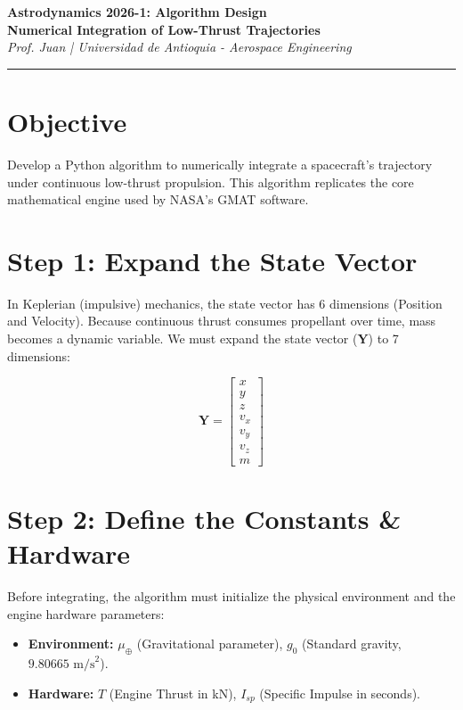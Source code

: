\documentclass[11pt, letterpaper]{article}
\begin{document}
\begin{center}
    {\Large \textbf{Astrodynamics 2026-1: Algorithm Design}} \\
    \vspace{0.2cm}
    {\huge \textbf{Numerical Integration of Low-Thrust Trajectories}} \\
    \vspace{0.4cm}
    \textit{Prof. Juan | Universidad de Antioquia - Aerospace Engineering}
\end{center}

\hrule
\vspace{0.5cm}

\section*{Objective}
Develop a Python algorithm to numerically integrate a spacecraft's trajectory under continuous low-thrust propulsion. This algorithm replicates the core mathematical engine used by NASA's GMAT software.

\section*{Step 1: Expand the State Vector}
In Keplerian (impulsive) mechanics, the state vector has 6 dimensions (Position and Velocity). Because continuous thrust consumes propellant over time, mass becomes a dynamic variable. We must expand the state vector ($\boldsymbol{Y}$) to 7 dimensions:

\begin{equation}
    \boldsymbol{Y} = 
    \begin{bmatrix}
        x \\ y \\ z \\ v_x \\ v_y \\ v_z \\ m
    \end{bmatrix}
\end{equation}

\section*{Step 2: Define the Constants \& Hardware}
Before integrating, the algorithm must initialize the physical environment and the engine hardware parameters:
\begin{itemize}
    \item \textbf{Environment:} $\mu_\oplus$ (Gravitational parameter), $g_0$ (Standard gravity, $9.80665 \text{ m/s}^2$).
    \item \textbf{Hardware:} $T$ (Engine Thrust in kN), $I_{sp}$ (Specific Impulse in seconds).
\end{itemize}
\end{document}
